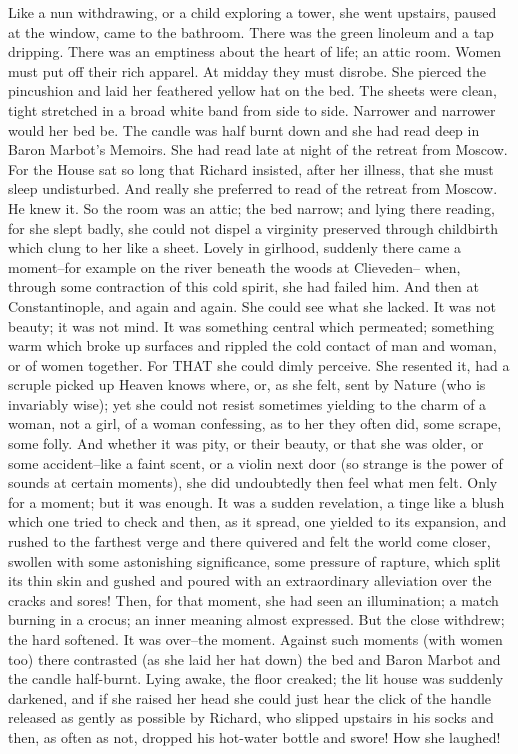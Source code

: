 \documentclass[lang=cn,10pt]{elegantbook}
\begin{document}
Like a nun withdrawing, or a child exploring a tower, she went
upstairs, paused at the window, came to the bathroom.  There was
the green linoleum and a tap dripping.  There was an emptiness
about the heart of life; an attic room.  Women must put off their
rich apparel.  At midday they must disrobe.  She pierced the
pincushion and laid her feathered yellow hat on the bed.  The
sheets were clean, tight stretched in a broad white band from side
to side.  Narrower and narrower would her bed be.  The candle was
half burnt down and she had read deep in Baron Marbot's Memoirs.
She had read late at night of the retreat from Moscow.  For the
House sat so long that Richard insisted, after her illness, that
she must sleep undisturbed.  And really she preferred to read of
the retreat from Moscow.  He knew it.  So the room was an attic;
the bed narrow; and lying there reading, for she slept badly, she
could not dispel a virginity preserved through childbirth which
clung to her like a sheet.  Lovely in girlhood, suddenly there came
a moment--for example on the river beneath the woods at Clieveden--
when, through some contraction of this cold spirit, she had failed
him.  And then at Constantinople, and again and again.  She could
see what she lacked.  It was not beauty; it was not mind.  It was
something central which permeated; something warm which broke up
surfaces and rippled the cold contact of man and woman, or of women
together.  For THAT she could dimly perceive.  She resented it, had
a scruple picked up Heaven knows where, or, as she felt, sent by
Nature (who is invariably wise); yet she could not resist sometimes
yielding to the charm of a woman, not a girl, of a woman
confessing, as to her they often did, some scrape, some folly.  And
whether it was pity, or their beauty, or that she was older, or
some accident--like a faint scent, or a violin next door (so
strange is the power of sounds at certain moments), she did
undoubtedly then feel what men felt.  Only for a moment; but it was
enough.  It was a sudden revelation, a tinge like a blush which one
tried to check and then, as it spread, one yielded to its
expansion, and rushed to the farthest verge and there quivered and
felt the world come closer, swollen with some astonishing
significance, some pressure of rapture, which split its thin skin
and gushed and poured with an extraordinary alleviation over the
cracks and sores!  Then, for that moment, she had seen an
illumination; a match burning in a crocus; an inner meaning almost
expressed.  But the close withdrew; the hard softened.  It was
over--the moment.  Against such moments (with women too) there
contrasted (as she laid her hat down) the bed and Baron Marbot and
the candle half-burnt.  Lying awake, the floor creaked; the lit
house was suddenly darkened, and if she raised her head she could
just hear the click of the handle released as gently as possible by
Richard, who slipped upstairs in his socks and then, as often as
not, dropped his hot-water bottle and swore!  How she laughed!
\end{document}
